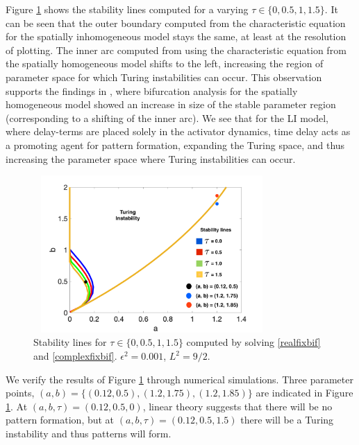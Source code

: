 Figure \ref{fig:tspacetau} shows the stability lines computed for a varying $\tau\in\{0,0.5,1,1.5\}$. It can be seen that the outer boundary computed from the characteristic equation for the spatially inhomogeneous model stays the same, at least at the resolution of plotting. The inner arc computed from using the characteristic equation from the spatially homogeneous model shifts to the left, increasing the region of parameter space for which Turing instabilities can occur. This observation supports the findings in \cite{william}, where bifurcation analysis for the spatially homogeneous model showed an increase in size of the stable parameter region (corresponding to a shifting of the inner arc). We see that for the LI model, where delay-terms are placed solely in the activator dynamics, time delay acts as a promoting agent for pattern formation, expanding the Turing space, and thus increasing the parameter space where Turing instabilities can occur.
\begin{figure}[H]
        \centering
        \includegraphics[width=9cm,height = 6cm]{tspacetau.png}
        \caption{Stability lines for $\tau\in\{0,0.5,1,1.5\}$ computed by solving \eqref{realfixbif} and \eqref{complexfixbif}. $\epsilon^2=0.001$, $L^2=9/2$.}
        \label{fig:tspacetau}
\end{figure}
We verify the results of Figure \ref{fig:tspacetau} through numerical simulations. Three parameter points, $(a,b)=\{(0.12,0.5),(1.2,1.75),(1.2,1.85)\}$ are indicated in Figure \ref{fig:tspacetau}. At $(a,b,\tau)=(0.12,0.5,0)$, linear theory suggests that there will be no pattern formation, but at $(a,b,\tau)=(0.12,0.5,1.5)$ there will be a Turing instability and thus patterns will form.
